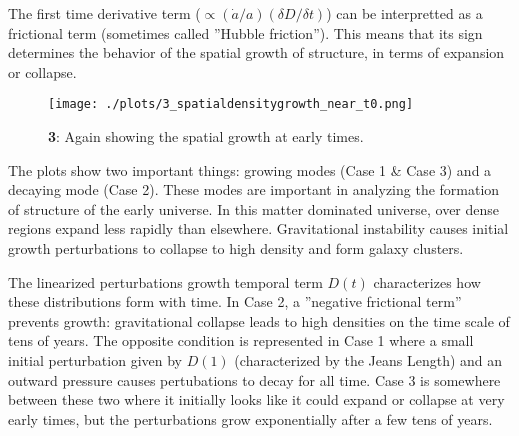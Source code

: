 The first time derivative term ($\propto (\dot{a}/a)(\delta D /\delta t)$) can be interpretted as a frictional term (sometimes called ''Hubble friction''). This means that its sign determines the behavior of the spatial growth of structure, in terms of expansion or collapse.


\begin{figure}[h!]
  \centering
  \texttt{[image: ./plots/3\_spatialdensitygrowth\_near\_t0.png]}
  \caption{\textbf{3}: Again showing the spatial growth at early times.}
  \label{fig:spatialdensitygrowtht0}
\end{figure}


The plots show two important things: growing modes (Case 1 \& Case 3) and a decaying mode (Case 2). These modes are important in analyzing the formation of structure of the early universe. In this matter dominated universe, over dense regions expand less rapidly than elsewhere. Gravitational instability causes initial growth perturbations to collapse to high density and form galaxy clusters.

The linearized perturbations growth temporal term $D(t)$ characterizes how these distributions form with time. In Case 2, a ''negative frictional term'' prevents growth: gravitational collapse leads to high densities on the time scale of tens of years. The opposite condition is represented in Case 1 where a small initial perturbation given by $D(1)$ (characterized by the Jeans Length) and an outward pressure causes pertubations to decay for all time. Case 3 is somewhere between these two where it initially looks like it could expand or collapse at very early times, but the perturbations grow exponentially after a few tens of years.

